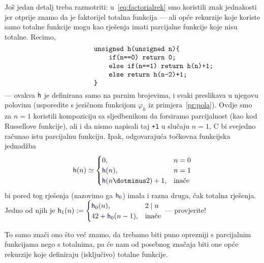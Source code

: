 Još jedan detalj treba razmotriti: u~\eqref{eq:factorialrek} smo koristili znak jednakosti jer otprije znamo da je faktorijel totalna funkcija --- ali opće rekurzije koje koriste samo totalne funkcije mogu kao rješenja imati parcijalne funkcije koje nisu totalne. Recimo,
\begin{equation}\begin{minipage}{0.8\textwidth}
\begin{verbatim}
                unsigned h(unsigned n){
                    if(n==0) return 0;
                    else if(n==1) return h(n)+1;
                    else return h(n-2)+1;
                }
\end{verbatim}
\end{minipage}\end{equation}
--- ovakva $\f h$ je definirana samo na parnim  brojevima, i svaki preslikava u njegovu polovinu (usporedite s jezičnom funkcijom $\varphi_h$ iz primjera~\ref{pr:pola}). Ovdje smo za $n=1$ koristili kompoziciju sa sljedbenikom da forsiramo parcijalnost (kao kod Russellove funkcije), ali i da nismo napisali taj \texttt{+1} u slučaju $n=1$, C bi svejedno računao istu parcijalnu funkciju. Ipak, odgovarajuća točkovna funkcijska jednadžba
\begin{equation}\label{eq:halfmany}
    \f h(n)\simeq\begin{cases}
        0,&n=0\\
        \f h(n),&n=1\\
        \f h(n\dotminus2)+1,&\text{inače}
    \end{cases}
\end{equation}
bi pored tog rješenja (nazovimo ga $\f h_0$) imala i razna druga, čak totalna rješenja. Jedno od njih je
$
    \f h_1(n):=\begin{cases}
        \f h_0(n),&2\mid n\\
        42+\f h_0(n-1),&\text{inače}
    \end{cases}
$ --- provjerite!

To samo znači ono što već znamo, da trebamo biti puno oprezniji s parcijalnim funkcijama nego s totalnima, pa će nam od posebnog značaja biti one opće rekurzije koje definiraju (isključivo) totalne funkcije.

